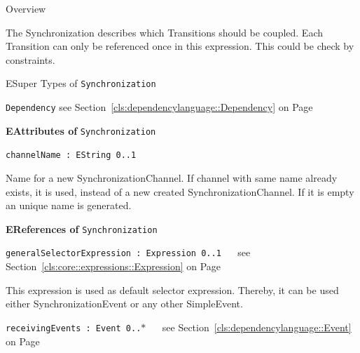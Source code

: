 	\begin{longdescription}
		\item[Overview] 		
				

	

		The Synchronization describes which Transitions should be coupled.
Each Transition can only be referenced once in this expression.
This could be check by constraints.		
		\item[ESuper Types of \texttt{Synchronization}] ~
			\begin{longdescription}
				\item[\texttt{Dependency}] see Section~\ref{cls:dependencylanguage::Dependency} on Page~\pageref{cls:dependencylanguage::Dependency}						\end{longdescription}
		
	
			\item[\textbf{EAttributes of} \texttt{Synchronization}] ~
			\begin{longdescription}
	\item[\texttt{channelName : EString \symbol{"5B}0..1\symbol{"5D}
}] ~
	
	
	\nopagebreak
		
				

	

		Name for a new SynchronizationChannel. If channel with same name already exists, it is used, instead of a new created SynchronizationChannel.
If it is empty an unique name is generated.		
			\end{longdescription}
			\item[\textbf{EReferences of} \texttt{Synchronization}] ~
			\begin{longdescription}
	\item[\texttt{generalSelectorExpression : Expression \symbol{"5B}0..1\symbol{"5D}
}] ~
	see Section~\ref{cls:core::expressions::Expression} on Page~\pageref{cls:core::expressions::Expression}
	
	\nopagebreak
		
				

	

		This expression is used as default selector expression.
Thereby, it can be used either SynchronizationEvent or any other SimpleEvent.		
	\item[\texttt{receivingEvents : Event \symbol{"5B}0..$*$\symbol{"5D}
}] ~
	see Section~\ref{cls:dependencylanguage::Event} on Page~\pageref{cls:dependencylanguage::Event}
	
	\nopagebreak
		
				


\end{longdescription}
\end{longdescription}
